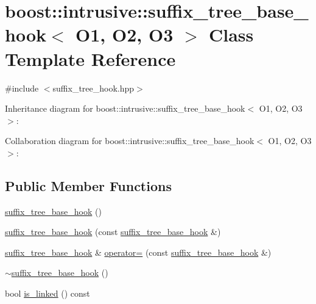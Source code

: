 \hypertarget{classboost_1_1intrusive_1_1suffix__tree__base__hook}{}\section{boost\+:\+:intrusive\+:\+:suffix\+\_\+tree\+\_\+base\+\_\+hook$<$ O1, O2, O3 $>$ Class Template Reference}
\label{classboost_1_1intrusive_1_1suffix__tree__base__hook}


{\ttfamily \#include $<$suffix\+\_\+tree\+\_\+hook.\+hpp$>$}



Inheritance diagram for boost\+:\+:intrusive\+:\+:suffix\+\_\+tree\+\_\+base\+\_\+hook$<$ O1, O2, O3 $>$\+:


Collaboration diagram for boost\+:\+:intrusive\+:\+:suffix\+\_\+tree\+\_\+base\+\_\+hook$<$ O1, O2, O3 $>$\+:
\subsection*{Public Member Functions}
\begin{DoxyCompactItemize}
\item 
\hyperlink{classboost_1_1intrusive_1_1suffix__tree__base__hook_a0b60b44862fb847732f6728753ba4d09}{suffix\+\_\+tree\+\_\+base\+\_\+hook} ()
\item 
\hyperlink{classboost_1_1intrusive_1_1suffix__tree__base__hook_a2a49909a66aa82a565d3f0fa6fa45412}{suffix\+\_\+tree\+\_\+base\+\_\+hook} (const \hyperlink{classboost_1_1intrusive_1_1suffix__tree__base__hook}{suffix\+\_\+tree\+\_\+base\+\_\+hook} \&)
\item 
\hyperlink{classboost_1_1intrusive_1_1suffix__tree__base__hook}{suffix\+\_\+tree\+\_\+base\+\_\+hook} \& \hyperlink{classboost_1_1intrusive_1_1suffix__tree__base__hook_a3f1dff2ec03d48d4c4caad6622374e7a}{operator=} (const \hyperlink{classboost_1_1intrusive_1_1suffix__tree__base__hook}{suffix\+\_\+tree\+\_\+base\+\_\+hook} \&)
\item 
\hyperlink{classboost_1_1intrusive_1_1suffix__tree__base__hook_a5b93f2dd321b1ebf770e953bf884853d}{$\sim$suffix\+\_\+tree\+\_\+base\+\_\+hook} ()
\item 
bool \hyperlink{classboost_1_1intrusive_1_1suffix__tree__base__hook_aa7681d0387834b9a0e1822e79ac1c531}{is\+\_\+linked} () const
\end{DoxyCompactItemize}


